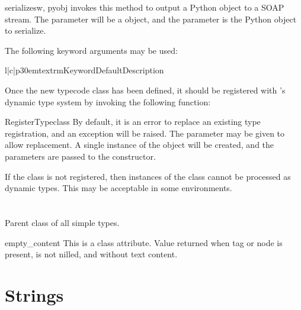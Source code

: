 \begin{methoddesc}{serialize}{sw, pyobj}
\ZSI{} invokes this method to output a Python object to a SOAP stream.
The  parameter will be a  object, and
the  parameter is the Python object to serialize.

The following keyword arguments may be used:

\begin{tableiii}{l|c|p{30em}}{textrm}{Keyword}{Default}{Description}
\end{tableiii}
\end{methoddesc}

Once the new typecode class has been defined, it should be registered with
\ZSI{}'s dynamic type system by invoking the following function:

\begin{funcdesc}{RegisterType}{class}
By default, it is an error to replace an existing type registration, and
an exception will be raised.
The  parameter may be given to allow replacement.
A single instance of the  object will be created, and
the  parameters are passed to the constructor.
\end{funcdesc}

If the class is not registered, then instances of the class cannot be
processed as dynamic types.
This may be acceptable in some environments.

\section{}
Parent class of all simple types.

\begin{memberdesc}{empty_content}
This is a class attribute.
Value returned when tag or node is present, is not nilled, and without text
content.
\end{memberdesc}

\section{Strings}

